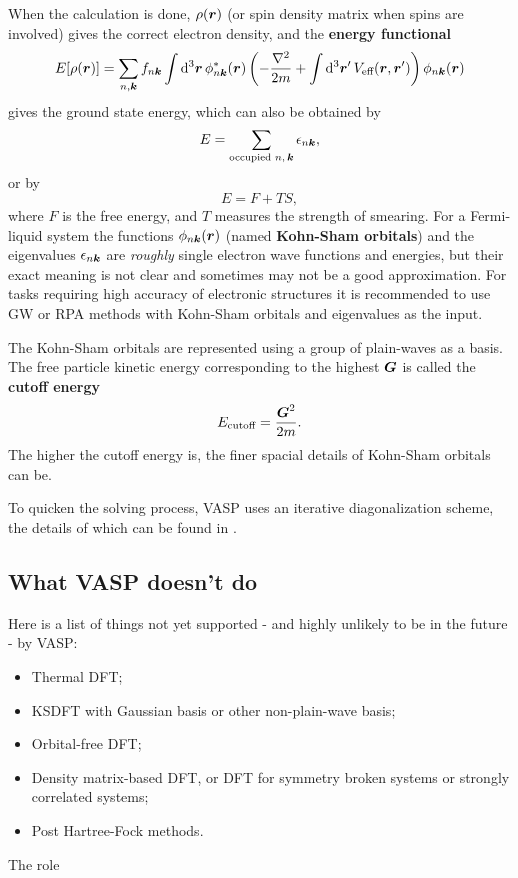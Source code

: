 \documentclass[hyperref, a4paper]{article}
\newcommand*{\concept}[1]{{\textbf{#1}}}
\begin{document}
When the calculation is done, $\rho(\vb*{r})$ (or spin density matrix when spins are involved) gives the correct electron density, and the \concept{energy functional}
\begin{equation}
    E[\rho(\vb*{r})] = \sum_{n, \vb*{k}} f_{n \vb*{k}} \int \dd[3]{\vb*{r}} \phi_{n \vb*{k}}^*(\vb*{r}) \left( - \frac{\laplacian}{2m  } + \int \dd[3]{\vb*{r}'} V_\text{eff}(\vb*{r}, \vb*{r}') \right) \phi_{n \vb*{k}}(\vb*{r}) 
\end{equation}
gives the ground state energy, which can also be obtained by
\begin{equation}
    E = \sum_\text{occupied $n, \vb*{k}$} \epsilon_{n \vb*{k}},
\end{equation}
or by 
\begin{equation}
    E = F + TS,
\end{equation}
where $F$ is the free energy, and $T$ measures the strength of smearing.
For a Fermi-liquid system the functions $\phi_{n \vb*{k}}(\vb*{r})$ (named \concept{Kohn-Sham orbitals}) and the eigenvalues $\epsilon_{n \vb*{k}}$ are \emph{roughly} single electron wave functions and energies, but their exact meaning is not clear and sometimes may not be a good approximation.
For tasks requiring high accuracy of electronic structures it is recommended to use GW or RPA methods with Kohn-Sham orbitals and eigenvalues as the input.

The Kohn-Sham orbitals are represented using a group of plain-waves as a basis.
The free particle kinetic energy corresponding to the highest $\vb*{G}$ is called the \concept{cutoff energy}
\begin{equation}
    E_\text{cutoff} = \frac{\vb*{G}^2}{2m}.
\end{equation}
The higher the cutoff energy is, the finer spacial details of Kohn-Sham orbitals can be.

To quicken the solving process, VASP uses an iterative diagonalization scheme, the details of which can be found in \cite{groundstate}.

\subsection{What VASP doesn't do}

Here is a list of things not yet supported - and highly unlikely to be in the future - by VASP:
\begin{itemize}
    \item Thermal DFT;
    \item KSDFT with Gaussian basis or other non-plain-wave basis;
    \item Orbital-free DFT;
    \item Density matrix-based DFT, or DFT for symmetry broken systems or strongly correlated systems;
    \item Post Hartree-Fock methods.
\end{itemize}
The role 
\end{document}
